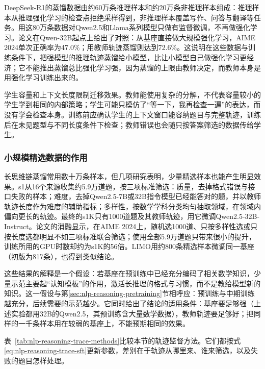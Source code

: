 DeepSeek-R1的蒸馏数据由约60万条推理样本和约20万条非推理样本组成：推理样本从推理强化学习的检查点拒绝采样得到，非推理样本覆盖写作、问答与翻译等任务。用这80万条数据对Qwen2.5和Llama系列模型只做有监督微调，不再做强化学习。论文在Qwen-32B起点上给出了对照：从基座直接做大规模强化学习，AIME 2024单次正确率为47.0\%；用教师轨迹蒸馏则达到72.6\%。这说明在这些数据与训练条件下，把强模型的推理轨迹蒸馏给小模型，比让小模型自己做强化学习更经济；它不能推出蒸馏总比强化学习强，因为蒸馏的上限由教师决定，而教师本身是用强化学习训练出来的。

学生容量和上下文长度限制迁移效果。教师能使用复杂的分解，不代表容量较小的学生学到相同的内部策略；学生可能只模仿了“等一下，我再检查一遍”的表达，而没有学会检查本身。训练前应确认学生的上下文窗口能容纳题目与完整轨迹，训练后在未见题型与不同长度条件下检查；教师错误也会随只按答案筛选的数据传给学生。

\subsubsection{小规模精选数据的作用}
\label{sec:nlp-reasoning-small-data}

长思维链蒸馏常用数十万条样本，但几项研究表明，少量精选样本也能产生明显效果。s1从16个来源收集约5.9万道题，按三项标准筛选：质量，去掉格式错误与接口失败的样本；难度，去掉Qwen2.5-7B或32B指令模型已经能答对的题，并以教师轨迹长度作为难度的辅助指标；多样性，按数学学科分类均匀抽取领域，在领域内偏向更长的轨迹。最终的s1K只有1000道题及其教师轨迹，用它微调Qwen2.5-32B-Instruct。论文的消融显示，在AIME 2024上，随机选1000道、只按多样性选或只按长度选都明显不如三项标准联合筛选；使用全部5.9万道题只带来很小的提升，训练所用的GPU时数却约为s1K的56倍。LIMO用约800条精选样本微调同一基座（初版为817条），也得到类似结论。

这些结果的解释是一个假设：若基座在预训练中已经充分编码了相关数学知识，少量示范主要起“认知模板”的作用，激活长推理的格式与习惯，而不是教给模型新的知识。这一假设与第\ref{sec:nlp-reasoning-pretraining}节相呼应：预训练与中期训练越充分，后续需要的示范越少。它同时给出了结论的适用条件：基座要足够强（上述实验都用32B的Qwen2.5，其预训练含大量数学数据），教师轨迹要足够好；把同样的一千条样本用在较弱的基座上，不能预期相同的效果。

表~\ref{tab:nlp-reasoning-trace-methods}比较本节的轨迹监督方法。它们都按式\eqref{eq:nlp-reasoning-trace-sft}更新参数，差别在于轨迹从哪里来、谁来筛选，以及失败的题目怎样处理。

